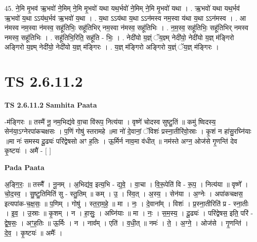 \documentclass[17pt]{extarticle}
\begin{document}
45. ने॒मि मृ॒भव॑ ऋ॒भवो॑ ने॒मिम् ने॒मि मृ॒भवो॑ यथा यथ॒र्भवो॑ ने॒मिम् ने॒मि मृ॒भवो॑ यथा । . ऋ॒भवो॑ यथा यथ॒र्भव॑ ऋ॒भवो॑ य॒था ऽऽय॑थ॒र्भव॑ ऋ॒भवो॑ य॒था । . य॒था ऽऽय॑था य॒था ऽऽन॑मस्व नम॒स्वा य॑था य॒था ऽऽन॑मस्व । . आ न॑मस्व नम॒स्वा न॑मस्व॒ सहू॑तिभिः॒ सहू॑तिभिर् नम॒स्वा न॑मस्व॒ सहू॑तिभिः । . न॒म॒स्व॒ सहू॑तिभिः॒ सहू॑तिभिर् नमस्व नमस्व॒ सहू॑तिभिः । . सहू॑तिभि॒रिति॒ सहू॑ति - भिः॒ । . नेदी॑यो य॒ज्ञ्ं ॅय॒ज्ञ्म् नेदी॑यो॒ नेदी॑यो य॒ज्ञ् म॑ङ्गिरो अङ्गिरो य॒ज्ञ्म् नेदी॑यो॒ नेदी॑यो य॒ज्ञ् म॑ङ्गिरः । . य॒ज्ञ् म॑ङ्गिरो अङ्गिरो य॒ज्ञ्ं ॅय॒ज्ञ् म॑ङ्गिरः । \newline
\pagebreak
{}

\section{ TS 2.6.11.2 }

\textbf{TS 2.6.11.2 } \newline
\textbf{Samhita Paata} \newline

-म॑ङ्गिरः ॥ तस्मै॑ नू॒ नम॒भिद्य॑वे वा॒चा वि॑रूप॒ नित्य॑या । वृष्णे॑ चोदस्व सुष्टु॒तिं ॥ कमु॑ ष्विदस्य॒ सेन॑या॒ऽग्नेरपा॑कचक्षसः । प॒णिं गोषु॑ स्तरामहे ॥मा नो॑ दे॒वानां॒ ॅविशः॑ प्रस्ना॒तीरि॑वो॒स्राः । कृ॒शं न हा॑सु॒रघ्नि॑याः ॥मा नः॑ समस्य दू॒ढ्यः॑ परि॑द्वेषसो अꣳ ह॒तिः । ऊ॒र्मिर्न नाव॒मा व॑धीत् ॥ नम॑स्ते अग्न॒ ओज॑से गृ॒णन्ति॑ देव कृ॒ष्टयः॑ । अमै॑ - [  ] \newline

\textbf{Pada Paata} \newline

अ॒ङ्गि॒रः॒ ॥ तस्मै᳚ । नू॒नम् । अ॒भिद्य॑व॒ इत्य॒भि - द्य॒वे॒ । वा॒चा । वि॒रू॒पेति॑ वि - रू॒प॒ । नित्य॑या ॥ वृष्णे᳚ । चो॒द॒स्व॒ । सु॒ष्टु॒तिमिति॑ सु - स्तु॒तिम् ॥ कम् । उ॒ । स्वि॒त् । अ॒स्य॒ । सेन॑या । अ॒ग्नेः । अपा॑कचक्षस॒ इत्यपा॑क-च॒क्ष॒सः॒ ॥ प॒णिम् । गोषु॑ । स्त॒रा॒म॒हे॒ ॥ मा । नः॒ । दे॒वाना᳚म् । विशः॑ । प्र॒स्ना॒तीरिति॑ प्र - स्ना॒तीः । इ॒व॒ । उ॒स्राः ॥ कृ॒शम् । न । हा॒सुः॒ । अघ्नि॑याः ॥ मा । नः॒ । स॒म॒स्य॒ । दू॒ढ्यः॑ । परि॑द्वेषस॒ इति॒ परि॑ - द्वे॒ष॒सः॒ । अꣳ॒॒ह॒तिः ॥ ऊ॒र्मिः । न । नाव᳚म् । एति॑ । व॒धी॒त् ॥ नमः॑ । ते॒ । अ॒ग्ने॒ । ओज॑से । गृ॒णन्ति॑ । दे॒व॒ । कृ॒ष्टयः॑ ॥ अमैः᳚ ।  \newline
\end{document}
